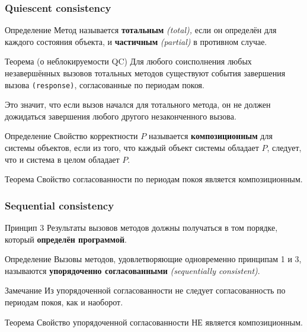 \documentclass[aspectratio=169, pdf, 8pt, unicode]{beamer}
\newcounter{defCnt}
\newcounter{thmCnt}
\begin{document}
\begin{frame}[fragile]
\frametitle{Quiescent consistency}
\begin{block}{Определение }
    Метод называется \textbf{тотальным} \textit{(total),} если он определён для каждого состояния объекта,
    и \textbf{частичным} \textit{(partial)} в противном случае.
\end{block}
\begin{block}{Теорема  (о неблокируемости QC)}
    Для любого соисполнения любых незавершённых вызовов тотальных методов существуют события завершения вызова \texttt{(response)},
    согласованные по периодам покоя.
\end{block}
Это значит, что если вызов начался для тотального метода, он не должен дожидаться завершения любого другого незаконченного вызова.
\begin{block}{Определение }
    Свойство корректности $P$ называется \textbf{композиционным} для системы объектов, если из того, что каждый объект системы
    обладает $P$, следует, что и система в целом обладает $P$.
\end{block}
\begin{block}{Теорема }
    Свойство согласованности по периодам покоя является композиционным.
\end{block}
\end{frame}

\begin{frame}[fragile]
\frametitle{Sequential consistency}
\begin{exampleblock}{Принцип 3}
    Результаты вызовов методов должны получаться в том порядке, который \textbf{определён программой}.
\end{exampleblock}
\begin{block}{Определение }
    Вызовы методов, удовлетворяющие одновременно принципам 1 и 3, называются \textbf{упорядоченно согласованными}
    \textit{(sequentially consistent)}.
\end{block}
\begin{block}{Замечание}
    Из упорядоченной согласованности не следует согласованность по периодам покоя, как и наоборот.
\end{block}
\begin{block}{Теорема }
    Свойство упорядоченной согласованности НЕ является композиционным.
\end{block}
\end{frame}
\end{document}
